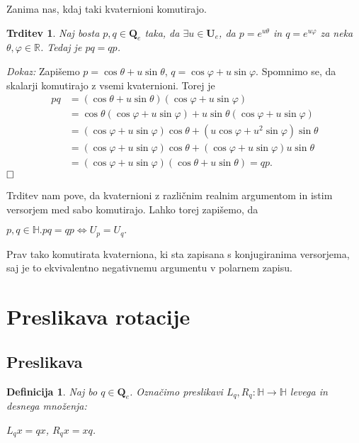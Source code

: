 \documentclass[a4paper,12pt]{article}
\def\R{\mathbb{R}} %
\def\H{\mathbb{H}} %
\def\Qe{\textbf{Q}_{e}} %
\def\Ue{\textbf{U}_{e}} %
\def\qed{$\hfill\Box$}   %
\newtheorem{trditev}{Trditev}
\newtheorem{definicija}{Definicija}
\begin{document}
Zanima nas, kdaj taki kvaternioni komutirajo.
\begin{trditev}
Naj bosta $p,q \in \Qe$ taka, da $\exists u \in \Ue$, da $p = e^{u\theta}$ in $q = e^{u\varphi}$ za neka $\theta, \varphi \in \R$.
Tedaj je $pq = qp$.
\end{trditev}
\noindent
{\em Dokaz:\/} Zapišemo $p = \cos\theta + u\sin\theta$, $q = \cos\varphi + u\sin\varphi$.
Spomnimo se, da skalarji komutirajo z vsemi kvaternioni. Torej je
\begin{align*}
   pq & = (\cos\theta + u\sin\theta)(\cos\varphi + u\sin\varphi)\\
   & = \cos\theta(\cos\varphi + u\sin\varphi) + u\sin\theta(\cos\varphi + u\sin\varphi)\\
   & = (\cos\varphi + u\sin\varphi)\cos\theta + (u\cos\varphi + u^2\sin\varphi)\sin\theta\\
   & = (\cos\varphi + u\sin\varphi)\cos\theta + (\cos\varphi + u\sin\varphi)u\sin\theta\\
   & = (\cos\varphi + u\sin\varphi)(\cos\theta + u\sin\theta) = qp.
\end{align*}
\qed

Trditev nam pove, da kvaternioni z različnim realnim argumentom in istim versorjem med sabo komutirajo. Lahko torej zapišemo, da 
\begin{center}
   $p,q \in \H. pq = qp \iff U_{p} = U_{q}.$
\end{center}
Prav tako komutirata kvaterniona, ki sta zapisana s konjugiranima versorjema, saj je to ekvivalentno negativnemu argumentu v polarnem zapisu.

\section{Preslikava rotacije}
\subsection{Preslikava}
\begin{definicija}
Naj bo $q \in \Qe$. Označimo preslikavi $L_{q}, R_{q} : \H \to \H$ levega in desnega množenja:
\begin{center}
   $L_{q}x = qx$, $R_{q}x = xq$.
\end{center}
\end{definicija}
\end{document}
